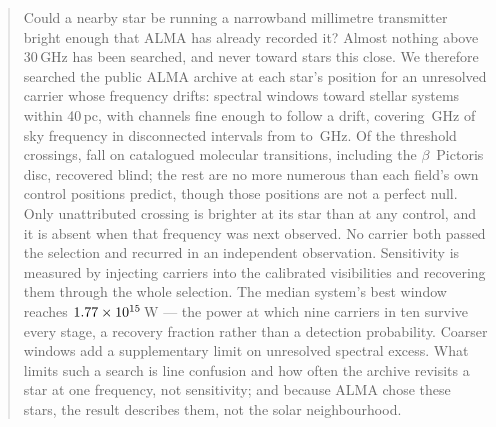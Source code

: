 \begin{abstract}
Could a nearby star be running a narrowband millimetre transmitter bright
enough that ALMA has already recorded it? Almost nothing above 30\,GHz has
been searched, and never toward stars this close. We therefore searched the
public ALMA archive at each star's position for an unresolved carrier whose
frequency drifts: \NWinA{} spectral windows
toward \NSysClassA{} stellar systems within 40\,pc, with channels fine
enough to follow a drift, covering \DnuA\,GHz of sky frequency in
disconnected intervals from \SurvFreqLoA{} to \SurvFreqHiA\,GHz. Of the
\NCross{} threshold crossings, \NAttributed{} fall on catalogued molecular
transitions, including the $\beta$~Pictoris disc, recovered blind; the rest
are no more numerous than each field's own control positions predict,
though those positions are not a perfect null. Only \NUnattrRankFlagged{}
unattributed crossing is brighter at its star than at any control, and it
is absent when that frequency was next observed. No carrier both passed
the selection and recurred in an independent observation. Sensitivity is
measured by injecting carriers into the calibrated visibilities and
recovering them through the whole selection. The median system's best window
reaches $\EirpNinetySysMedA$\,W --- the power at which nine carriers in ten
survive every stage, a recovery fraction rather than a detection probability.
Coarser windows add a supplementary limit on unresolved spectral excess.
What limits such a search is line confusion and how often the archive
revisits a star at one frequency, not sensitivity; and because ALMA chose
these stars, the result describes them, not the solar neighbourhood.
\end{abstract}


